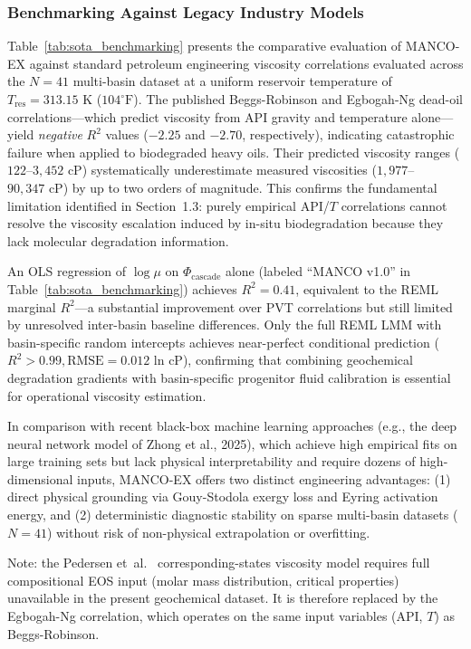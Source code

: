 \documentclass[review,12pt]{elsarticle}
\begin{document}
\subsubsection{Benchmarking Against Legacy Industry Models}
Table~\ref{tab:sota_benchmarking} presents the comparative evaluation of MANCO-EX against standard petroleum engineering viscosity correlations evaluated across the $N = 41$ multi-basin dataset at a uniform reservoir temperature of $T_{\text{res}} = 313.15\text{ K}$ ($104^{\circ}\text{F}$). The published Beggs-Robinson \citep{beggs1975viscosity} and Egbogah-Ng \citep{egbogah1990improved} dead-oil correlations---which predict viscosity from API gravity and temperature alone---yield \emph{negative} $R^2$ values ($-2.25$ and $-2.70$, respectively), indicating catastrophic failure when applied to biodegraded heavy oils. Their predicted viscosity ranges ($122$--$3{,}452\text{ cP}$) systematically underestimate measured viscosities ($1{,}977$--$90{,}347\text{ cP}$) by up to two orders of magnitude. This confirms the fundamental limitation identified in Section~1.3: purely empirical API/$T$ correlations cannot resolve the viscosity escalation induced by in-situ biodegradation because they lack molecular degradation information.

An OLS regression of $\log\mu$ on $\Phi_{\text{cascade}}$ alone (labeled ``MANCO v1.0'' in Table~\ref{tab:sota_benchmarking}) achieves $R^2 = 0.41$, equivalent to the REML marginal $R^2$---a substantial improvement over PVT correlations but still limited by unresolved inter-basin baseline differences. Only the full REML LMM with basin-specific random intercepts achieves near-perfect conditional prediction ($R^2 > 0.99, \text{RMSE} = 0.012\text{ ln cP}$), confirming that combining geochemical degradation gradients with basin-specific progenitor fluid calibration is essential for operational viscosity estimation.

In comparison with recent black-box machine learning approaches (e.g., the deep neural network model of Zhong et al., 2025), which achieve high empirical fits on large training sets but lack physical interpretability and require dozens of high-dimensional inputs, MANCO-EX offers two distinct engineering advantages: (1) direct physical grounding via Gouy-Stodola exergy loss and Eyring activation energy, and (2) deterministic diagnostic stability on sparse multi-basin datasets ($N=41$) without risk of non-physical extrapolation or overfitting.

Note: the Pedersen et~al.\ \citep{pedersen1984viscosity} corresponding-states viscosity model requires full compositional EOS input (molar mass distribution, critical properties) unavailable in the present geochemical dataset. It is therefore replaced by the Egbogah-Ng correlation, which operates on the same input variables (API, $T$) as Beggs-Robinson.
\end{document}
